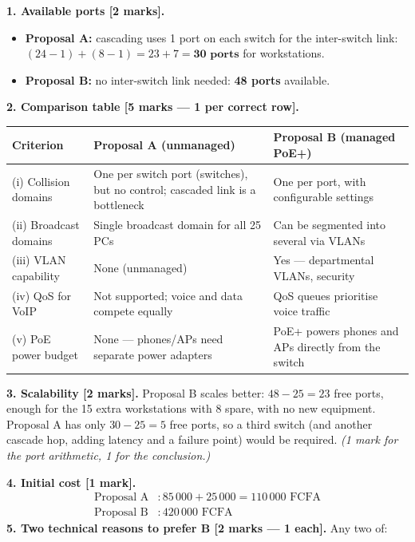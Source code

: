 \documentclass[11pt]{article}
\begin{document}
\begin{corrige}
\textbf{1. Available ports [2 marks].}
\begin{itemize}
\item \textbf{Proposal A:} cascading uses 1 port on each switch for the inter-switch link: $(24-1)+(8-1)=23+7=\textbf{30 ports}$ for workstations.
\item \textbf{Proposal B:} no inter-switch link needed: \textbf{48 ports} available.
\end{itemize}
\textbf{2. Comparison table [5 marks — 1 per correct row].}
\begin{center}
\begin{tabularx}{\linewidth}{|l|X|X|}\hline
\rowcolor{popblueL}\textbf{Criterion} & \textbf{Proposal A (unmanaged)} & \textbf{Proposal B (managed PoE+)} \\ \hline
(i) Collision domains & One per switch port (switches), but no control; cascaded link is a bottleneck & One per port, with configurable settings \\ \hline
(ii) Broadcast domains & Single broadcast domain for all 25 PCs & Can be segmented into several via VLANs \\ \hline
(iii) VLAN capability & None (unmanaged) & Yes — departmental VLANs, security \\ \hline
(iv) QoS for VoIP & Not supported; voice and data compete equally & QoS queues prioritise voice traffic \\ \hline
(v) PoE power budget & None — phones/APs need separate power adapters & PoE+ powers phones and APs directly from the switch \\ \hline
\end{tabularx}
\end{center}
\textbf{3. Scalability [2 marks].} Proposal B scales better: $48-25=23$ free ports, enough for the 15 extra workstations with 8 spare, with no new equipment. Proposal A has only $30-25=5$ free ports, so a third switch (and another cascade hop, adding latency and a failure point) would be required. \emph{(1 mark for the port arithmetic, 1 for the conclusion.)}
\par
\textbf{4. Initial cost [1 mark].}
\begin{align*}
\text{Proposal A} &: 85\,000 + 25\,000 = 110\,000 \text{ FCFA} \\
\text{Proposal B} &: 420\,000 \text{ FCFA}
\end{align*}
\textbf{5. Two technical reasons to prefer B [2 marks — 1 each].} Any two of:

\end{corrige}
\end{document}
